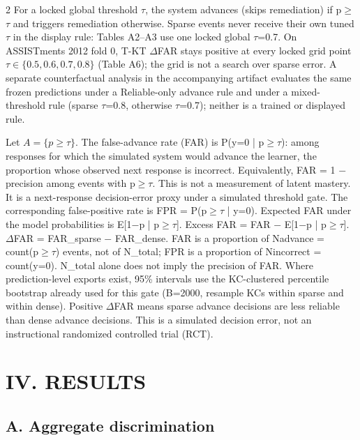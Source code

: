 \documentclass[10pt,a4paper]{article}
\begin{document}
\begin{multicols}{2}
For a locked global threshold $\tau$, the system advances (skips remediation) if p$\geq$$\tau$ and triggers remediation otherwise. Sparse events never receive their own tuned $\tau$ in the display rule: Tables A2--A3 use one locked global $\tau$=0.7. On ASSISTments 2012 fold 0, T-KT $\Delta$FAR stays positive at every locked grid point $\tau\in\{0.5, 0.6, 0.7, 0.8\}$ (Table A6); the grid is not a search over sparse error. A separate counterfactual analysis in the accompanying artifact evaluates the same frozen predictions under a Reliable-only advance rule and under a mixed-threshold rule (sparse $\tau$=0.8, otherwise $\tau$=0.7); neither is a trained or displayed rule.

Let $A=\{p\geq\tau\}$. The false-advance rate (FAR) is P(y=0 | p$\geq$$\tau$): among responses for which the simulated system would advance the learner, the proportion whose observed next response is incorrect. Equivalently, FAR = 1 $-$ precision among events with p$\geq$$\tau$. This is not a measurement of latent mastery. It is a next-response decision-error proxy under a simulated threshold gate. The corresponding false-positive rate is FPR = P(p$\geq$$\tau$ | y=0). Expected FAR under the model probabilities is E[1$-$p | p$\geq$$\tau$]. Excess FAR = FAR $-$ E[1$-$p | p$\geq$$\tau$]. $\Delta$FAR = FAR\_sparse $-$ FAR\_dense. FAR is a proportion of Nadvance = count(p$\geq$$\tau$) events, not of N\_total; FPR is a proportion of Nincorrect = count(y=0). N\_total alone does not imply the precision of FAR. Where prediction-level exports exist, 95\% intervals use the KC-clustered percentile bootstrap already used for this gate (B=2000, resample KCs within sparse and within dense). Positive $\Delta$FAR means sparse advance decisions are less reliable than dense advance decisions. This is a simulated decision error, not an instructional randomized controlled trial (RCT).

\section*{\MakeUppercase{IV. RESULTS}}

\subsection*{A. Aggregate discrimination}


\end{multicols}
\end{document}
